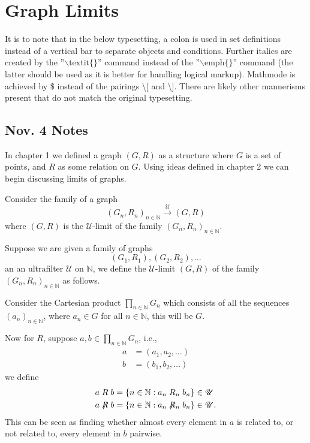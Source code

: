 \documentclass{maatext}
\theoremstyle{definition}
\theoremstyle{remark}
\numberwithin{section}{chapter}
\numberwithin{equation}{chapter}
\begin{document}
\mainmatter

\chapter{Graph Limits}

{\color{red} It is to note that in the below typesetting, a colon is used in set definitions instead of a vertical bar to separate objects and conditions. Further italics are created by the ''$\backslash \text{textit}\{\}$'' command instead of the ''$\backslash \text{emph}\{\}$'' command (the latter should be used as it is better for handling logical markup). Mathmode is achieved by \$ instead of the pairings \textbackslash[ and \textbackslash]. There are likely other mannerisms present that do not match the original typesetting.}

\section{Nov. 4 Notes}
In chapter 1 we defined a graph $(G,R)$ as a structure where $G$ is a set of points, and $R$ as some relation on $G$. Using ideas defined in chapter 2 we can begin discussing limits of graphs.

Consider the family of a graph
$$(G_n, R_n)_{n \in \mathbb{N}} \overset{\mathscr{U}}\to (G,R)$$
where $(G,R)$ is the $\mathscr{U}$-limit of the family $(G_n, R_n)_{n \in \mathbb{N}}$.

Suppose we are given a family of graphs
$$(G_1, R_1), (G_2, R_2), \dots$$
an an ultrafilter $\mathscr{U}$ on $\mathbb{N}$, we define the $\mathscr{U}$-limit $(G, R)$ of the family $(G_n, R_n)_{n \in \mathbb{N}}$ as follows.

Consider the Cartesian product $\prod_{n\in \mathbb{N}} G_n$ which consists of all the sequences  $(a_n)_{n \in \mathbb{N}}$, where $a_n \in G$ for all $n \in \mathbb{N}$, this will be $G$.

Now for $R$, suppose $a,b \in \prod_{n \in \mathbb{N}} G_n$, i.e.,
\begin{align*}
a &= (a_1, a_2, \dots)\\
b &= (b_1, b_2, \dots)
\end{align*}
we define 
\begin{align*}
a \mathrel{R} b &= \{n \in \mathbb{N} : a_n \mathrel{R}_n b_n \} \in \mathscr{U}\\
a \not\mathrel{R} b &= \{n \in \mathbb{N} : a_n \not\mathrel{R}_n b_n \} \in \mathscr{U}.
\end{align*}
This can be seen as finding whether almost every element in $a$ is related to, or not related to, every element in $b$ pairwise.
\end{document}

